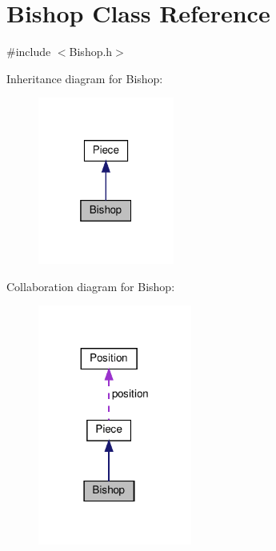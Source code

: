 \hypertarget{class_bishop}{}\section{Bishop Class Reference}
\label{class_bishop}


{\ttfamily \#include $<$Bishop.\+h$>$}



Inheritance diagram for Bishop\+:\nopagebreak
\begin{figure}[H]
\begin{center}
\leavevmode
\includegraphics[width=127pt]{class_bishop__inherit__graph}
\end{center}
\end{figure}


Collaboration diagram for Bishop\+:\nopagebreak
\begin{figure}[H]
\begin{center}
\leavevmode
\includegraphics[width=143pt]{class_bishop__coll__graph}
\end{center}
\end{figure}
